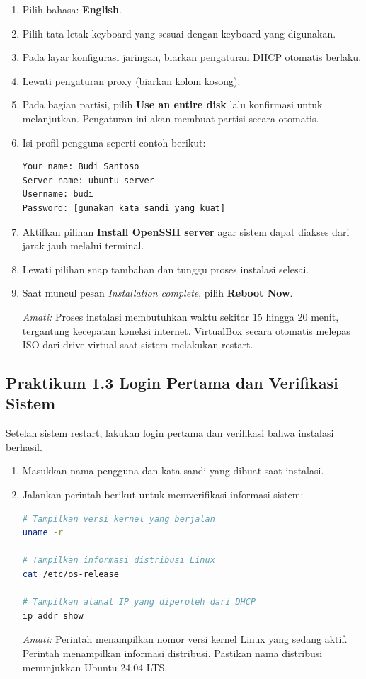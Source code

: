 \begin{enumerate}
    \item Pilih bahasa: \textbf{English}.
    \item Pilih tata letak keyboard yang sesuai dengan keyboard yang digunakan.
    \item Pada layar konfigurasi jaringan, biarkan pengaturan DHCP otomatis berlaku.
    \item Lewati pengaturan proxy (biarkan kolom kosong).
    \item Pada bagian partisi, pilih \textbf{Use an entire disk} lalu konfirmasi untuk
    melanjutkan. Pengaturan ini akan membuat partisi secara otomatis.
    \item Isi profil pengguna seperti contoh berikut:
    \begin{lstlisting}[caption={Contoh isian profil pengguna}]
Your name: Budi Santoso
Server name: ubuntu-server
Username: budi
Password: [gunakan kata sandi yang kuat]
    \end{lstlisting}
    \item Aktifkan pilihan \textbf{Install OpenSSH server} agar sistem dapat diakses
    dari jarak jauh melalui terminal.
    \item Lewati pilihan snap tambahan dan tunggu proses instalasi selesai.
    \item Saat muncul pesan \textit{Installation complete}, pilih \textbf{Reboot Now}.

    \textit{Amati:} Proses instalasi membutuhkan waktu sekitar 15 hingga 20 menit,
    tergantung kecepatan koneksi internet. VirtualBox secara otomatis melepas ISO dari
    drive virtual saat sistem melakukan restart.
\end{enumerate}

\subsection*{Praktikum 1.3 Login Pertama dan Verifikasi Sistem}

Setelah sistem restart, lakukan login pertama dan verifikasi bahwa instalasi berhasil.

\begin{enumerate}
    \item Masukkan nama pengguna dan kata sandi yang dibuat saat instalasi.
    \item Jalankan perintah berikut untuk memverifikasi informasi sistem:

    \begin{lstlisting}[language=bash, caption={Verifikasi informasi sistem}]
# Tampilkan versi kernel yang berjalan
uname -r

# Tampilkan informasi distribusi Linux
cat /etc/os-release

# Tampilkan alamat IP yang diperoleh dari DHCP
ip addr show
    \end{lstlisting}

    \textit{Amati:} Perintah  menampilkan nomor versi kernel Linux yang
    sedang aktif. Perintah  menampilkan informasi distribusi.
    Pastikan nama distribusi menunjukkan Ubuntu 24.04 LTS.
\end{enumerate}

